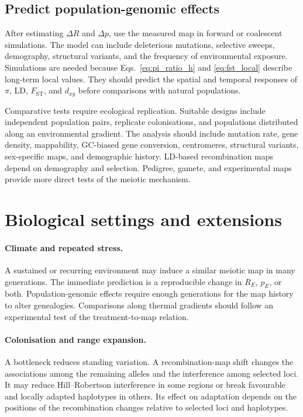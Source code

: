 \documentclass[11pt]{article}
\theoremstyle{remark}
\newcommand{\FST}{F_{\mathrm{ST}}}
\newcommand{\dxy}{d_{xy}}
\begin{document}
\subsection{Predict population-genomic effects}

After estimating $\Delta R$ and $\Delta p$, use the measured map in forward or
coalescent simulations. The model can include deleterious mutations, selective
sweeps, demography, structural variants, and the frequency of environmental
exposure. Simulations are needed because Eqs.~\eqref{eq:pi_ratio_h} and
\eqref{eq:fst_local} describe long-term local values. They should predict the spatial and
temporal responses of $\pi$, LD, $\FST$, and $\dxy$ before comparisons with natural
populations.

Comparative tests require ecological replication. Suitable designs include
independent population pairs, replicate colonisations, and populations distributed
along an environmental gradient. The analysis should include mutation rate, gene
density, mappability, GC-biased gene conversion, centromeres, structural variants,
sex-specific maps, and demographic history. LD-based recombination maps depend on
demography and selection. Pedigree, gamete, and experimental maps provide more
direct tests of the meiotic mechanism.



\section{Biological settings and extensions}
\label{sec:regimes}

\paragraph{Climate and repeated stress.}
A sustained or recurring environment may induce a similar meiotic map in many
generations. The immediate prediction is a reproducible change in $R_E$, $p_E$, or
both. Population-genomic effects require enough generations for the map history to
alter genealogies. Comparisons along thermal gradients should follow an experimental test of the
treatment-to-map relation.

\paragraph{Colonisation and range expansion.}
A bottleneck reduces standing variation. A recombination-map shift changes the
associations among the remaining alleles and the interference among selected loci.
It may reduce Hill--Robertson interference in some regions or break favourable and
locally adapted haplotypes in others. Its effect on adaptation depends on the
positions of the recombination changes relative to selected loci and haplotypes.
\end{document}
